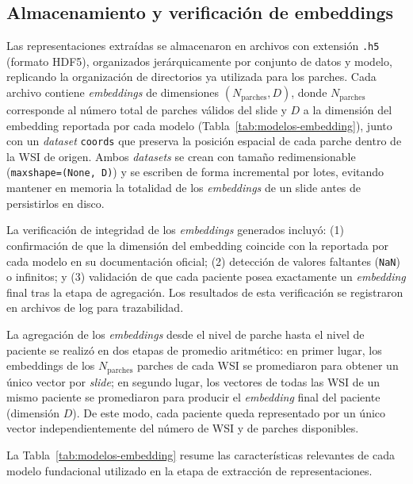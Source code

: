 \subsection{Almacenamiento y verificación de embeddings}
\label{sec:almacenamiento-embeddings}

Las representaciones extraídas se almacenaron en archivos con extensión \texttt{.h5}
(formato HDF5), organizados jerárquicamente por conjunto de datos y modelo,
replicando la organización de directorios ya utilizada para los parches. 
Cada archivo contiene 
\textit{embeddings} de dimensiones $(N_{\text{parches}}, D)$, donde $N_{\text{parches}}$
corresponde al número total de parches válidos del slide y $D$ a la dimensión del
embedding reportada por cada modelo (Tabla~\ref{tab:modelos-embedding}), junto con
un \textit{dataset} \texttt{coords} que preserva la posición espacial de cada
parche dentro de la WSI de origen. Ambos \textit{datasets} se crean con tamaño
redimensionable (\texttt{maxshape=(None, D)}) y se escriben de forma incremental por
lotes, evitando mantener en memoria la totalidad de los \textit{embeddings} de un slide antes
de persistirlos en disco.

La verificación de integridad de los \textit{embeddings} generados incluyó: (1) confirmación
de que la dimensión del embedding coincide con la reportada por cada modelo en su
documentación oficial; (2) detección de valores faltantes (\texttt{NaN}) o
infinitos; y (3) validación de que cada paciente posea exactamente un \textit{embedding}
final tras la etapa de agregación. Los resultados de esta verificación se
registraron en archivos de log para trazabilidad.

La agregación de los \textit{embeddings} desde el nivel de parche hasta el nivel de
paciente se realizó en dos etapas de promedio aritmético: en primer lugar, los
embeddings de los $N_{\text{parches}}$ parches de cada WSI se promediaron para
obtener un único vector por \textit{slide}; en segundo lugar, los vectores de todas
las WSI de un mismo paciente se promediaron para producir el \textit{embedding} final
del paciente (dimensión $D$). De este modo, cada paciente queda representado por un
único vector independientemente del número de WSI y de parches disponibles.

La Tabla~\ref{tab:modelos-embedding} resume las características relevantes de cada
modelo fundacional utilizado en la etapa de extracción de representaciones.

